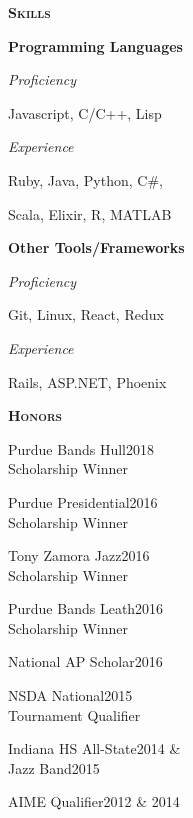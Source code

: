 \documentclass[11pt]{article}
\newcommand{\sectionfont}{\Large\scshape\bfseries\color{cg505green}}
\begin{document}
\begin{minipage}[t]{0.3\textwidth}
  {\sectionfont Skills}

  \textbf{Programming Languages}
  \begin{adjustwidth}{10pt}{}
    \emph{Proficiency}

    \quad Javascript, C/C++, Lisp

    \emph{Experience}

    \quad Ruby, Java, Python, C\#,

    \quad Scala, Elixir, R, MATLAB
  \end{adjustwidth}

  \textbf{Other Tools/Frameworks}
  \begin{adjustwidth}{10pt}{}
    \emph{Proficiency}

    \quad Git, Linux, React, Redux

    \emph{Experience}

    \quad Rails, ASP.NET, Phoenix
  \end{adjustwidth}

  \vspace{5pt}

  {\sectionfont Honors}
  \begin{adjustwidth}{10pt}{}
    Purdue Bands Hull\hfill 2018\\
    Scholarship Winner

    Purdue Presidential\hfill 2016\\
    Scholarship Winner

    Tony Zamora Jazz\hfill 2016\\
    Scholarship Winner

    Purdue Bands Leath\hfill 2016\\
    Scholarship Winner

    National AP Scholar\hfill 2016

    NSDA National\hfill 2015\\
    Tournament Qualifier

    Indiana HS All-State\hfill 2014 \&\\
    Jazz Band\hfill 2015

    AIME Qualifier\hfill 2012 \& 2014
  \end{adjustwidth}
\end{minipage}
\hfill\vrule\hfill{}
\end{document}
